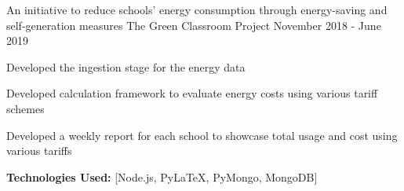 \begin{cventries}
  \cventry
    {An initiative to reduce schools' energy consumption through energy-saving and self-generation measures}
    {The Green Classroom Project} %
    {} %
    {November 2018 - June 2019} %
    {
      \begin{cvitems} %
        \item {Developed the ingestion stage for the energy data}
        \item {Developed calculation framework to evaluate energy costs using various tariff schemes}
        \item {Developed a weekly report for each school to showcase total usage and cost using various tariffs}
		\item {\textbf{Technologies Used:} [Node.js, PyLaTeX, PyMongo, MongoDB]}
      \end{cvitems}
    }

\end{cventries}